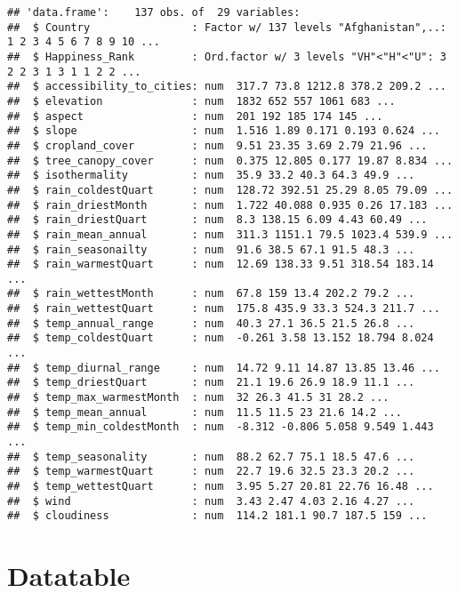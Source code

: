 \documentclass[]{book}
\begin{document}
\begin{verbatim}
## 'data.frame':    137 obs. of  29 variables:
##  $ Country                : Factor w/ 137 levels "Afghanistan",..: 1 2 3 4 5 6 7 8 9 10 ...
##  $ Happiness_Rank         : Ord.factor w/ 3 levels "VH"<"H"<"U": 3 2 2 3 1 3 1 1 2 2 ...
##  $ accessibility_to_cities: num  317.7 73.8 1212.8 378.2 209.2 ...
##  $ elevation              : num  1832 652 557 1061 683 ...
##  $ aspect                 : num  201 192 185 174 145 ...
##  $ slope                  : num  1.516 1.89 0.171 0.193 0.624 ...
##  $ cropland_cover         : num  9.51 23.35 3.69 2.79 21.96 ...
##  $ tree_canopy_cover      : num  0.375 12.805 0.177 19.87 8.834 ...
##  $ isothermality          : num  35.9 33.2 40.3 64.3 49.9 ...
##  $ rain_coldestQuart      : num  128.72 392.51 25.29 8.05 79.09 ...
##  $ rain_driestMonth       : num  1.722 40.088 0.935 0.26 17.183 ...
##  $ rain_driestQuart       : num  8.3 138.15 6.09 4.43 60.49 ...
##  $ rain_mean_annual       : num  311.3 1151.1 79.5 1023.4 539.9 ...
##  $ rain_seasonailty       : num  91.6 38.5 67.1 91.5 48.3 ...
##  $ rain_warmestQuart      : num  12.69 138.33 9.51 318.54 183.14 ...
##  $ rain_wettestMonth      : num  67.8 159 13.4 202.2 79.2 ...
##  $ rain_wettestQuart      : num  175.8 435.9 33.3 524.3 211.7 ...
##  $ temp_annual_range      : num  40.3 27.1 36.5 21.5 26.8 ...
##  $ temp_coldestQuart      : num  -0.261 3.58 13.152 18.794 8.024 ...
##  $ temp_diurnal_range     : num  14.72 9.11 14.87 13.85 13.46 ...
##  $ temp_driestQuart       : num  21.1 19.6 26.9 18.9 11.1 ...
##  $ temp_max_warmestMonth  : num  32 26.3 41.5 31 28.2 ...
##  $ temp_mean_annual       : num  11.5 11.5 23 21.6 14.2 ...
##  $ temp_min_coldestMonth  : num  -8.312 -0.806 5.058 9.549 1.443 ...
##  $ temp_seasonality       : num  88.2 62.7 75.1 18.5 47.6 ...
##  $ temp_warmestQuart      : num  22.7 19.6 32.5 23.3 20.2 ...
##  $ temp_wettestQuart      : num  3.95 5.27 20.81 22.76 16.48 ...
##  $ wind                   : num  3.43 2.47 4.03 2.16 4.27 ...
##  $ cloudiness             : num  114.2 181.1 90.7 187.5 159 ...
\end{verbatim}

\hypertarget{datatable}{%
\section{Datatable}\label{datatable}}
\end{document}
